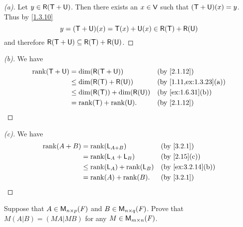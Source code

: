 \begin{proof}[(a)]
	Let \(y \in \rg{\T + \U}\).
	Then there exists an \(x \in \mathsf{V}\) such that \((\mathsf{T} + \mathsf{U})(x) = y\).
	Thus by \cref{1.3.10}
	\[
		y = (\T + \U)(x) = \T(x) + \U(x) \in \rg{\T} + \rg{\U}
	\]
	and therefore \(\rg{\T + \U} \subseteq \rg{\T} + \rg{\U}\).
\end{proof}

\begin{proof}[(b)]
	We have
	\begin{align*}
		\rk{\T + \U} & = \dim(\rg{\T + \U})               &  & \by{2.1.12}            \\
		             & \leq \dim(\rg{\T} + \rg{\U})       &  & \by{1.11,ex:1.3.23}[a] \\
		             & \leq \dim(\rg{\T}) + \dim(\rg{\U}) &  & \by{ex:1.6.31}[b]      \\
		             & = \rk{\T} + \rk{\U}.               &  & \by{2.1.12}
	\end{align*}
\end{proof}

\begin{proof}[(c)]
	We have
	\begin{align*}
		\rk{A + B} & = \rk{\L_{A + B}}          &  & \by{3.2.1}        \\
		           & = \rk{\L_A + \L_B}         &  & \by{2.15}[c]      \\
		           & \leq \rk{\L_A} + \rk{\L_B} &  & \by{ex:3.2.14}[b] \\
		           & = \rk{A} + \rk{B}.         &  & \by{3.2.1}
	\end{align*}
\end{proof}

\begin{ex}\label{ex:3.2.15}
	Suppose that \(A \in \ms[n][p][\F]\) and \(B \in \ms[n][q][\F]\).
	Prove that \(M (A | B) = (MA | MB)\) for any \(M \in \ms\).
\end{ex}

